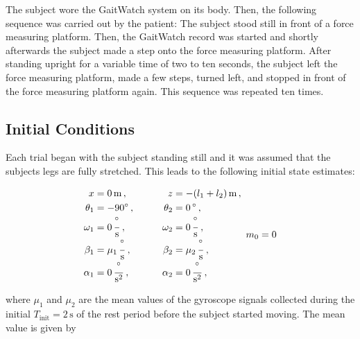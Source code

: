 The subject wore the GaitWatch system on its body. Then, the following sequence was carried out by the patient: The subject stood still in front of a force measuring platform. Then, the GaitWatch record was started and shortly afterwards the subject made a step onto the force measuring platform. After standing upright for a variable time of two to ten seconds, the subject left the force measuring platform, made a few steps, turned left, and stopped in front of the force measuring platform again. This sequence was repeated ten times.

\subsection{Initial Conditions}

Each trial began with the subject standing still and it was assumed that the subjects legs are fully stretched. This leads to the following initial state estimates:

\begin{equation}
\begin{matrix}
	\begin{split}
	  x &= 0\,\mbox{m}\,, \\
	  \theta_1 &= -90^{\circ}\,, \\
	  \omega_1 &= 0\,\frac{^{\circ}}{\mbox{s}}\,, \\
	  \beta_1 &= \mu_1\,\frac{^{\circ}}{\mbox{s}}\,, \\
	  \alpha_1 &= 0\,\frac{^{\circ}}{\mbox{s}^2}\,, 
\end{split} \qquad \quad
    \begin{split}
   	  z &= -(l_1+l_2)\,\mbox{m}\,, \\
	  \theta_2 &= 0\,^{\circ}\,, \mathrel{\phantom{90^{\circ}}}\\
	  \omega_2 &= 0\,\frac{^{\circ}}{\mbox{s}}\,, \\
	  \beta_2 &= \mu_2\,\frac{^{\circ}}{\mbox{s}}\,, \\
	  \alpha_2 &= 0\,\frac{^{\circ}}{\mbox{s}^2}\,,  
\end{split}
\end{matrix} \\
	  m_0 = 0
\end{equation}

\noindent
where $\mu_1$ and $\mu_2$ are the mean values of the gyroscope signals collected during the initial $T_{\text{init}} = 2\,\mbox{s}$ of the rest period before the subject started moving. The mean value is given by

